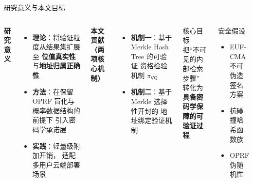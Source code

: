 \begin{frame}{研究意义与本文目标}

  \begin{columns}[T]
      \textbf{研究意义}
      \begin{itemize}
        \item \textbf{理论}：将验证粒度从结果集扩展至
              \textbf{位值真实性}与\textbf{地址归属正确性}
        \item \textbf{方法}：在保留 OPRF 盲化与概率数据结构的前提下
              引入密码学承诺层
        \item \textbf{实践}：轻量级附加开销，
              适配多用户云端部署场景
      \end{itemize}

      \vspace{0.8em}
      \textbf{本文贡献（两项核心机制）}
      \begin{itemize}
        \item \textbf{机制一}：基于 Merkle Hash Tree 的可验证
              资格检验机制 $\pi_\mathsf{VQ}$
        \item \textbf{机制二}：基于 Merkle 选择性开封的
              地址绑定验证机制
      \end{itemize}

      \begin{exampleblock}{核心目标}
        \centering\large
        把``不可见的内部检索步骤''\\
        转化为\\
        \textbf{具备密码学保障的可验证过程}
      \end{exampleblock}

      \vspace{0.8em}
      \begin{block}{安全假设}
        \begin{itemize}
          \item EUF-CMA 不可伪造签名方案
          \item 抗碰撞哈希函数族
          \item OPRF 伪随机性
        \end{itemize}
      \end{block}
  \end{columns}

\end{frame}
